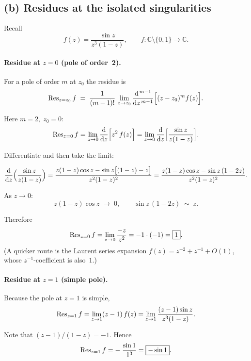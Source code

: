 \documentclass[12pt]{article}
\theoremstyle{definition} %
\theoremstyle{plain} %
\begin{document}
            \subsection*{(b)  Residues at the isolated singularities}

Recall 
\[
   f(z)=\frac{\sin z}{z^{3}(1-z)}, 
   \qquad f\colon\mathbb{C}\setminus\{0,1\}\to\mathbb{C} .
\]

\paragraph{Residue at \(z=0\) (pole of order 2).}

For a pole of order \(m\) at \(z_0\) the residue is
\[
   \Res_{z=z_0}f \;=\;
   \frac{1}{(m-1)!}\,
   \lim_{z\to z_0}
   \frac{\mathrm{d}^{\,m-1}}{\mathrm{d}z^{\,m-1}}
   \Bigl[(z-z_0)^{m}f(z)\Bigr].
\]

Here \(m=2,\;z_0=0\):
\[
\Res_{z=0}f
   =\lim_{z\to0}\frac{\mathrm{d}}{\mathrm{d}z}
     \Bigl[z^{2}\,f(z)\Bigr]
   =\lim_{z\to0}\frac{\mathrm{d}}{\mathrm{d}z}
     \Bigl[\frac{\sin z}{z(1-z)}\Bigr].
\]

Differentiate and then take the limit:

\[
\frac{\mathrm{d}}{\mathrm{d}z}
   \Bigl(\frac{\sin z}{z(1-z)}\Bigr)
   =\frac{z(1-z)\cos z-\sin z\bigl[(1-z)-z\bigr]}
          {z^{2}(1-z)^{2}}
   =\frac{z(1-z)\cos z-\sin z\,(1-2z)}{z^{2}(1-z)^{2}}.
\]

As \(z\to0\):
\[
   z(1-z)\cos z \;\longrightarrow\; 0,
   \qquad
   \sin z\,(1-2z) \;\sim\; z.
\]

Therefore
\[
   \Res_{z=0}f
   =\lim_{z\to0}\frac{-z}{z^{2}}=-1\cdot(-1)=\boxed{1}.
\]
(A quicker route is the Laurent series expansion
\(f(z)=z^{-2}+z^{-1}+O(1)\), whose \(z^{-1}\)-coefficient is also \(1\).)

\paragraph{Residue at \(z=1\) (simple pole).}

Because the pole at \(z=1\) is simple,
\[
   \Res_{z=1}f
   =\lim_{z\to1}(z-1)\,f(z)
   =\lim_{z\to1}
     \frac{(z-1)\sin z}{z^{3}(1-z)}.
\]

Note that \((z-1)/(1-z)=-1\).  Hence
\[
   \Res_{z=1}f
   =-\;\frac{\sin 1}{1^{3}}
   =\boxed{-\sin 1}.
\]
\end{document}
